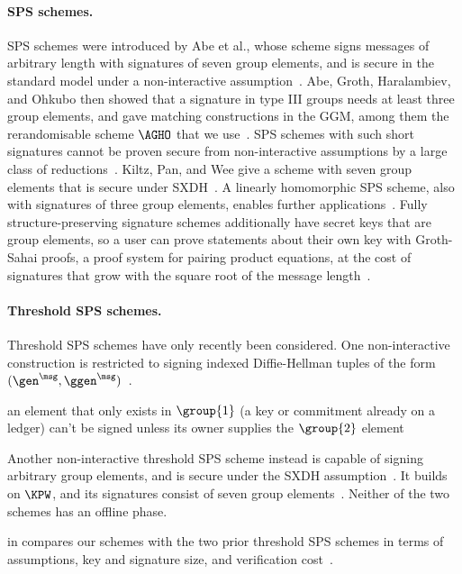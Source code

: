 \paragraph{SPS schemes.} SPS schemes were introduced by Abe et al., whose
scheme signs messages of arbitrary length
with signatures of seven group elements, and is secure in the standard model
under a non-interactive assumption~\cite{C:AFGHO10}. Abe, Groth, Haralambiev, and
Ohkubo then showed that a signature in type III groups needs at least three group
elements, and gave matching constructions in the GGM, among them the
rerandomisable scheme $\AGHO$ that we use~\cite{C:AGHO11}.
SPS schemes with such short signatures cannot be proven secure from non-interactive assumptions
by a large class of reductions~\cite{AC:AbeGroOhk11}. Kiltz, Pan, and Wee give a
scheme with seven group elements that is secure under SXDH~\cite{C:KilPanWee15}.
A linearly homomorphic SPS scheme, also with signatures of three group
elements, enables further applications~\cite{C:LPJY13}. Fully structure-preserving
signature schemes additionally have secret keys that are group elements, so
a user can prove statements about their own key with Groth-Sahai proofs, a
proof system for pairing product equations, at the
cost of signatures that grow with the square root of the message
length~\cite{JC:AGKOT19,EC:GroSah08}.

\paragraph{Threshold SPS schemes.} Threshold SPS schemes have only recently
been considered. One non-interactive construction is restricted to signing
indexed Diffie-Hellman tuples of the form $(\gen^\msg,
\ggen^\msg)$~\cite{AC:CKPSS23}.

\begin{outline}
  \item an element that only exists in $\group{1}$ (a key or commitment
already on a ledger) can't be signed unless its owner supplies the $\group{2}$
element
\end{outline}

Another non-interactive threshold SPS scheme instead is capable of signing
arbitrary group elements, and is secure under the SXDH
assumption~\cite{PKC:MMSST24}. It builds on $\KPW$, and its signatures consist
of seven group elements~\cite{C:KilPanWee15}.
Neither of the two schemes has an offline phase.

 in  compares our schemes with the
two prior threshold SPS schemes in terms of assumptions, key and signature size,
and verification cost~\cite{AC:CKPSS23,PKC:MMSST24}.

